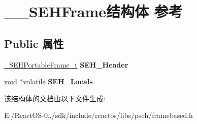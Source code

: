 \hypertarget{struct_____s_e_h_frame}{}\section{\+\_\+\+\_\+\+S\+E\+H\+Frame结构体 参考}
\label{struct_____s_e_h_frame}
\subsection*{Public 属性}
\begin{DoxyCompactItemize}
\item 
\mbox{\label{struct_____s_e_h_frame_a6fbb6b410031204d724ffa0a79ab0bc1}} 
\hyperlink{struct_____s_e_h_portable_frame}{\+\_\+\+S\+E\+H\+Portable\+Frame\+\_\+t} {\bfseries S\+E\+H\+\_\+\+Header}
\item 
\mbox{\label{struct_____s_e_h_frame_a091274bc6de864f328219fb664a2a532}} 
\hyperlink{interfacevoid}{void} $\ast$volatile {\bfseries S\+E\+H\+\_\+\+Locals}
\end{DoxyCompactItemize}


该结构体的文档由以下文件生成\+:\begin{DoxyCompactItemize}
\item 
E\+:/\+React\+O\+S-\/0../sdk/include/reactos/libs/pseh/framebased.\+h\end{DoxyCompactItemize}
